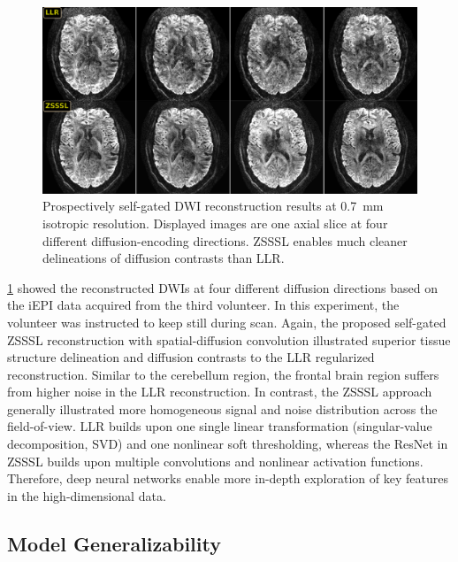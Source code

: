 \documentclass[journal,twoside,web]{ieeecolor}
\begin{document}
	\begin{figure}
		\includegraphics[width=\textwidth]{../figures/fig6.png}
		\caption{Prospectively self-gated DWI reconstruction results
			at 0.7~mm isotropic resolution. Displayed images are
			one axial slice at four different diffusion-encoding directions.
			ZSSSL enables much cleaner delineations of diffusion contrasts
			than LLR.}
		\label{FIG:SG_ZSSSL_VOL3}
	\end{figure}

	\cref{FIG:SG_ZSSSL_VOL3} showed the reconstructed DWIs
	at four different diffusion directions based on the iEPI data
	acquired from the third volunteer.
	In this experiment, the volunteer was instructed
	to keep still during scan.
	Again, the proposed self-gated ZSSSL reconstruction
	with spatial-diffusion convolution illustrated
	superior tissue structure delineation and 
	diffusion contrasts
	to the LLR regularized reconstruction. 
	Similar to the cerebellum region, 
	the frontal brain region suffers from higher noise 
	in the LLR reconstruction. 
	In contrast, the ZSSSL approach generally illustrated 
	more homogeneous signal and noise distribution 
	across the field-of-view. 
	LLR builds upon one single linear transformation 
	(singular-value decomposition, SVD) and one nonlinear soft thresholding, 
	whereas the ResNet in ZSSSL builds upon 
	multiple convolutions and nonlinear activation functions. 
	Therefore, deep neural networks enable more in-depth exploration 
	of key features in the high-dimensional data.


	\subsection{Model Generalizability}
\end{document}
